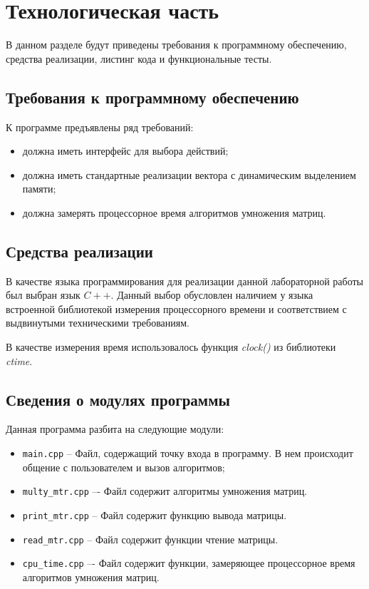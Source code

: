 \chapter{Технологическая часть}

В данном разделе будут приведены требования к программному обеспечению, средства реализации, листинг кода и функциональные тесты.

\section{Требования к программному обеспечению}

К программе предъявлены ряд требований:

\begin{itemize}
	\item должна иметь интерфейс для выбора действий;
	\item должна иметь стандартные реализации вектора с динамическим выделением памяти;
	\item должна замерять процессорное время алгоритмов умножения матриц.
\end{itemize}

\section{Средства реализации}

В качестве языка программирования для реализации данной лабораторной работы был выбран язык $C++$\cite{cpp-lang}. Данный выбор обусловлен  наличием у языка
встроенной библиотекой измерения процессорного времени и соответствием с выдвинутыми техническими требованиям.

В качестве измерения время использовалось функция \textit{clock()} из библиотеки \textit{ctime}\cite{cpp-lang-time}. 

\clearpage

\section{Сведения о модулях программы}

Данная программа разбита на следующие модули:

\begin{itemize}
	\item \texttt{main.cpp} -- Файл, содержащий точку входа в программу. В нем происходит
	общение с пользователем и вызов алгоритмов;
	\item \texttt{multy\_mtr.cpp} –- Файл содержит алгоритмы умножения матриц.
	\item \texttt{print\_mtr.cpp} -- Файл содержит функцию вывода матрицы.
	\item \texttt{read\_mtr.cpp} -- Файл содержит функции чтение матрицы.
	\item \texttt{cpu\_time.cpp} –- Файл содержит функции, замеряющее процессорное время алгоритмов умножения матриц.
\end{itemize}

